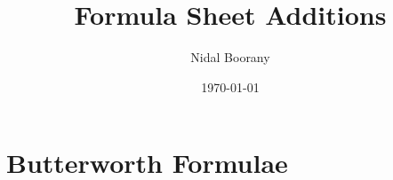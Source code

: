 \documentclass{article}
\begin{document}
\title{Formula Sheet Additions}
\author{Nidal Boorany}
\date{\today}
\maketitle

\section{Butterworth Formulae}
\end{document}
